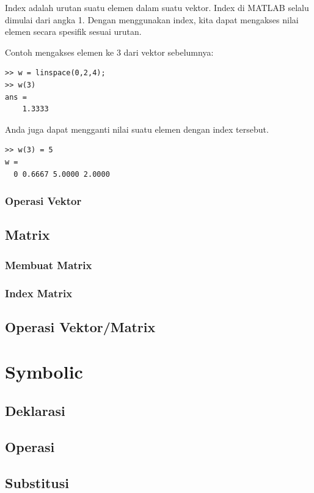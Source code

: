 \documentclass[12pt]{book}
\begin{document}
	Index adalah urutan suatu elemen dalam suatu vektor.
	Index di MATLAB selalu dimulai dari angka 1.
	Dengan menggunakan index, kita dapat mengakses nilai elemen secara spesifik sesuai urutan.
	
	Contoh mengakses elemen ke 3 dari vektor sebelumnya:
	\begin{verbatim}
>> w = linspace(0,2,4);
>> w(3)
ans = 
    1.3333
	\end{verbatim}

	Anda juga dapat mengganti nilai suatu elemen dengan index tersebut.
	\begin{verbatim}
>> w(3) = 5
w =
  0 0.6667 5.0000 2.0000
	\end{verbatim}

	\subsubsection{Operasi Vektor}
	
	\subsection{Matrix}
	\subsubsection{Membuat Matrix}
	\subsubsection{Index Matrix}
	
	\subsection{Operasi Vektor/Matrix}
	
	\section{Symbolic}
	
	\subsection{Deklarasi}
	\subsection{Operasi}
	\subsection{Substitusi}
	
\end{document}
